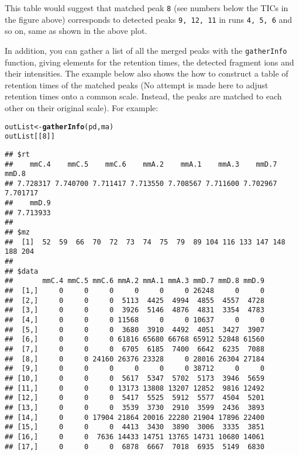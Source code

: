 \documentclass{article}\usepackage[]{graphicx}\usepackage[]{color}
\makeatletter
\newcommand{\hlnum}[1]{\textcolor[rgb]{0.686,0.059,0.569}{#1}}%
\newcommand{\hlstd}[1]{\textcolor[rgb]{0.345,0.345,0.345}{#1}}%
\newcommand{\hlkwb}[1]{\textcolor[rgb]{0.69,0.353,0.396}{#1}}%
\newcommand{\hlkwd}[1]{\textcolor[rgb]{0.737,0.353,0.396}{\textbf{#1}}}%
\newenvironment{kframe}{%
 \def\at@end@of@kframe{}%
 \ifinner\ifhmode%
  \def\at@end@of@kframe{\end{minipage}}%
  \begin{minipage}{\columnwidth}%
 \fi\fi%
 \def\FrameCommand##1{\hskip\@totalleftmargin \hskip-\fboxsep
 \colorbox{shadecolor}{##1}\hskip-\fboxsep
     \hskip-\linewidth \hskip-\@totalleftmargin \hskip\columnwidth}%
 \MakeFramed {\advance\hsize-\width
   \@totalleftmargin\z@ \linewidth\hsize
   \@setminipage}}%
 {\par\unskip\endMakeFramed%
 \at@end@of@kframe}
\newenvironment{knitrout}{}{} %
\makeatother
\begin{document}
\noindent This table would suggest that matched peak \texttt{8} (see
numbers below the TICs in the figure above) corresponds to detected
peaks \texttt{9, 12, 11} in runs \texttt{4, 5, 6} and so on, same as
shown in the above plot. 

In addition, you can gather a list of all the merged peaks with the
\texttt{gatherInfo} function, giving elements for the retention times,
the detected fragment ions and their intensities.  The example below
also shows the how to construct a table of retention times of the
matched peaks (No attempt is made here to adjust retention times onto
a common scale.  Instead, the peaks are matched to each other on their
original scale).  For example: 

\begin{knitrout}
\color{fgcolor}\begin{kframe}
\begin{alltt}
\hlstd{outList} \hlkwb{<-} \hlkwd{gatherInfo}\hlstd{(pd,ma)}
\hlstd{outList[[}\hlnum{8}\hlstd{]]}
\end{alltt}
\begin{verbatim}
## $rt
##    mmC.4    mmC.5    mmC.6    mmA.2    mmA.1    mmA.3    mmD.7    mmD.8 
## 7.728317 7.740700 7.711417 7.713550 7.708567 7.711600 7.702967 7.701717 
##    mmD.9 
## 7.713933 
## 
## $mz
##  [1]  52  59  66  70  72  73  74  75  79  89 104 116 133 147 148 188 204
## 
## $data
##       mmC.4 mmC.5 mmC.6 mmA.2 mmA.1 mmA.3 mmD.7 mmD.8 mmD.9
##  [1,]     0     0     0     0     0     0 26248     0     0
##  [2,]     0     0     0  5113  4425  4994  4855  4557  4728
##  [3,]     0     0     0  3926  5146  4876  4831  3354  4783
##  [4,]     0     0     0 11568     0     0 10637     0     0
##  [5,]     0     0     0  3680  3910  4492  4051  3427  3907
##  [6,]     0     0     0 61816 65680 66768 65912 52848 61560
##  [7,]     0     0     0  6705  6185  7400  6642  6235  7088
##  [8,]     0     0 24160 26376 23328     0 28016 26304 27184
##  [9,]     0     0     0     0     0     0 38712     0     0
## [10,]     0     0     0  5617  5347  5702  5173  3946  5659
## [11,]     0     0     0 13173 13808 13207 12852  9816 12492
## [12,]     0     0     0  5417  5525  5912  5577  4504  5201
## [13,]     0     0     0  3539  3730  2910  3599  2436  3893
## [14,]     0     0 17904 21864 20016 22280 21904 17896 22400
## [15,]     0     0     0  4413  3430  3890  3006  3335  3851
## [16,]     0     0  7636 14433 14751 13765 14731 10680 14061
## [17,]     0     0     0  6878  6667  7018  6935  5149  6830

\end{verbatim}
\end{kframe}
\end{knitrout}
\end{document}
